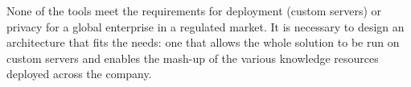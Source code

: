 None of the tools meet the requirements for deployment (custom servers) or privacy for a global enterprise in a regulated market. It is necessary to design an architecture that fits the needs: one that allows the whole solution to be run on custom servers and enables the mash-up of the various knowledge resources deployed across the company.